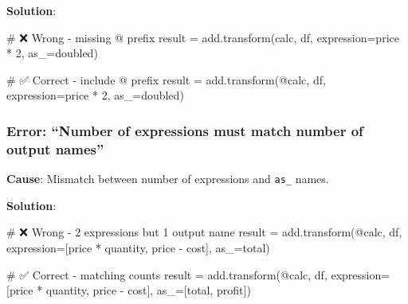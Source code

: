 \documentclass[
  letterpaper,
]{scrbook}
\newenvironment{Shaded}{\begin{snugshade}}{\end{snugshade}}
\newcommand{\CommentTok}[1]{\textcolor[rgb]{0.37,0.37,0.37}{#1}}
\newcommand{\NormalTok}[1]{\textcolor[rgb]{0.00,0.23,0.31}{#1}}
\newcommand{\OperatorTok}[1]{\textcolor[rgb]{0.37,0.37,0.37}{#1}}
\newcommand{\StringTok}[1]{\textcolor[rgb]{0.13,0.47,0.30}{#1}}
\begin{document}
\textbf{Solution}:

\begin{Shaded}
\begin{Highlighting}[]
\CommentTok{\# ❌ Wrong {-} missing @ prefix}
\NormalTok{result }\OperatorTok{=}\NormalTok{ add.transform(}\StringTok{\textquotesingle{}calc\textquotesingle{}}\NormalTok{, df, expression}\OperatorTok{=}\StringTok{\textquotesingle{}price * 2\textquotesingle{}}\NormalTok{, as\_}\OperatorTok{=}\StringTok{\textquotesingle{}doubled\textquotesingle{}}\NormalTok{)}

\CommentTok{\# ✅ Correct {-} include @ prefix}
\NormalTok{result }\OperatorTok{=}\NormalTok{ add.transform(}\StringTok{\textquotesingle{}@calc\textquotesingle{}}\NormalTok{, df, expression}\OperatorTok{=}\StringTok{\textquotesingle{}price * 2\textquotesingle{}}\NormalTok{, as\_}\OperatorTok{=}\StringTok{\textquotesingle{}doubled\textquotesingle{}}\NormalTok{)}
\end{Highlighting}
\end{Shaded}

\subsubsection{Error: ``Number of expressions must match number of
output
names''}\label{error-number-of-expressions-must-match-number-of-output-names}

\textbf{Cause}: Mismatch between number of expressions and \texttt{as\_}
names.

\textbf{Solution}:

\begin{Shaded}
\begin{Highlighting}[]
\CommentTok{\# ❌ Wrong {-} 2 expressions but 1 output name}
\NormalTok{result }\OperatorTok{=}\NormalTok{ add.transform(}\StringTok{\textquotesingle{}@calc\textquotesingle{}}\NormalTok{, df, }
\NormalTok{                       expression}\OperatorTok{=}\NormalTok{[}\StringTok{\textquotesingle{}price * quantity\textquotesingle{}}\NormalTok{, }\StringTok{\textquotesingle{}price {-} cost\textquotesingle{}}\NormalTok{],}
\NormalTok{                       as\_}\OperatorTok{=}\StringTok{\textquotesingle{}total\textquotesingle{}}\NormalTok{)}

\CommentTok{\# ✅ Correct {-} matching counts}
\NormalTok{result }\OperatorTok{=}\NormalTok{ add.transform(}\StringTok{\textquotesingle{}@calc\textquotesingle{}}\NormalTok{, df, }
\NormalTok{                       expression}\OperatorTok{=}\NormalTok{[}\StringTok{\textquotesingle{}price * quantity\textquotesingle{}}\NormalTok{, }\StringTok{\textquotesingle{}price {-} cost\textquotesingle{}}\NormalTok{],}
\NormalTok{                       as\_}\OperatorTok{=}\NormalTok{[}\StringTok{\textquotesingle{}total\textquotesingle{}}\NormalTok{, }\StringTok{\textquotesingle{}profit\textquotesingle{}}\NormalTok{])}
\end{Highlighting}
\end{Shaded}
\end{document}
